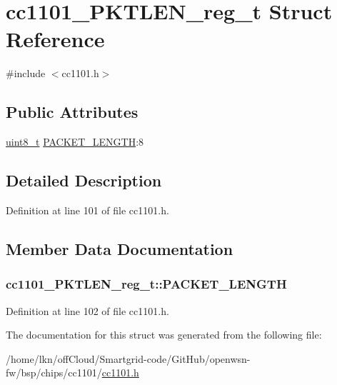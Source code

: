 \hypertarget{structcc1101___p_k_t_l_e_n__reg__t}{}\section{cc1101\+\_\+\+P\+K\+T\+L\+E\+N\+\_\+reg\+\_\+t Struct Reference}
\label{structcc1101___p_k_t_l_e_n__reg__t}


{\ttfamily \#include $<$cc1101.\+h$>$}

\subsection*{Public Attributes}
\begin{DoxyCompactItemize}
\item 
\hyperlink{_p_e___types_8h_aba7bc1797add20fe3efdf37ced1182c5}{uint8\+\_\+t} \hyperlink{structcc1101___p_k_t_l_e_n__reg__t_a37899b2240805d924e27a73e86bcb8ea}{P\+A\+C\+K\+E\+T\+\_\+\+L\+E\+N\+G\+TH}\+:8
\end{DoxyCompactItemize}


\subsection{Detailed Description}


Definition at line 101 of file cc1101.\+h.



\subsection{Member Data Documentation}
\subsubsection[{\texorpdfstring{P\+A\+C\+K\+E\+T\+\_\+\+L\+E\+N\+G\+TH}{PACKET_LENGTH}}]{ cc1101\+\_\+\+P\+K\+T\+L\+E\+N\+\_\+reg\+\_\+t\+::\+P\+A\+C\+K\+E\+T\+\_\+\+L\+E\+N\+G\+TH}\hypertarget{structcc1101___p_k_t_l_e_n__reg__t_a37899b2240805d924e27a73e86bcb8ea}{}\label{structcc1101___p_k_t_l_e_n__reg__t_a37899b2240805d924e27a73e86bcb8ea}


Definition at line 102 of file cc1101.\+h.



The documentation for this struct was generated from the following file\+:\begin{DoxyCompactItemize}
\item 
/home/lkn/off\+Cloud/\+Smartgrid-\/code/\+Git\+Hub/openwsn-\/fw/bsp/chips/cc1101/\hyperlink{cc1101_8h}{cc1101.\+h}\end{DoxyCompactItemize}
